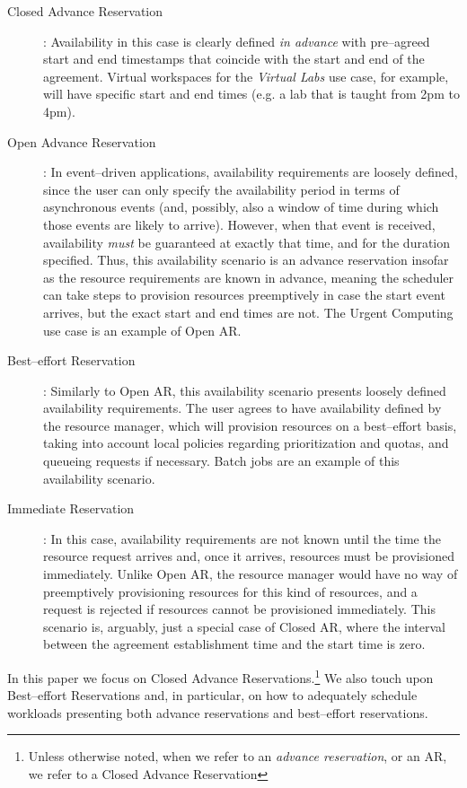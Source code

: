 \begin{description}
\item[Closed Advance Reservation]: Availability in this case is clearly defined \emph{in advance} with pre--agreed start and end timestamps that coincide with the start and end of the agreement. Virtual workspaces for the \emph{Virtual Labs} use case, for example, will have specific start and end times (e.g. a lab that is taught from 2pm to 4pm).
\item[Open Advance Reservation]: In event--driven applications, availability requirements are loosely defined, since the user can only specify the availability period in terms of asynchronous events (and, possibly, also a window of time during which those events are likely to arrive). However, when that event is received, availability \emph{must} be guaranteed at exactly that time, and for the duration specified. Thus, this availability scenario is an advance reservation insofar as the resource requirements are known in advance, meaning the scheduler can take steps to  provision resources preemptively in case the start event arrives, but the exact start and end times are not. The Urgent Computing use case is an example of Open AR.
\item[Best--effort Reservation]: Similarly to Open AR, this availability scenario presents loosely defined availability requirements. The user agrees to have availability defined by the resource manager, which will provision resources on a best--effort basis, taking into account local policies regarding prioritization and quotas, and queueing requests if necessary. Batch jobs are an example of this availability scenario.
\item[Immediate Reservation]: In this case, availability requirements are not known until the time the resource request arrives and, once it arrives, resources must be  provisioned immediately. Unlike Open AR, the resource manager would have no way of preemptively provisioning resources for this kind of resources, and a request is rejected if resources cannot be  provisioned immediately. This scenario is, arguably, just a special case of Closed AR, where the interval between the agreement establishment time and the start time is zero.
\end{description}

In this paper we focus on Closed Advance Reservations.\footnote{Unless otherwise noted, when we refer to an \emph{advance reservation}, or an AR, we refer to a Closed Advance Reservation} We also touch upon Best--effort Reservations and, in particular, on how to adequately schedule workloads presenting both advance reservations and best--effort reservations.
